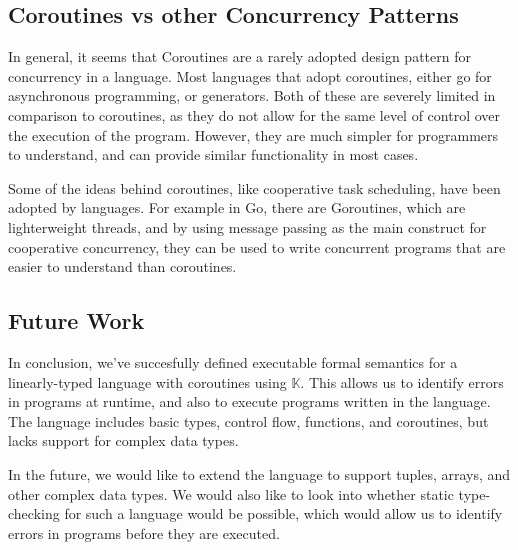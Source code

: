 \documentclass[review,twocolumn]{sigplanconf}
\begin{document}
\subsection*{Coroutines vs other Concurrency Patterns}

In general, it seems that Coroutines are a rarely adopted design pattern for concurrency in a language. Most languages that adopt coroutines, either go for asynchronous programming, or generators. Both of these are severely limited in comparison to coroutines, as they do not allow for the same level of control over the execution of the program. However, they are much simpler for programmers to understand, and can provide similar functionality in most cases.

Some of the ideas behind coroutines, like cooperative task scheduling, have been adopted by languages. For example in Go, there are Goroutines, which are lighterweight threads, and by using message passing as the main construct for cooperative concurrency, they can be used to write concurrent programs that are easier to understand than coroutines.

\subsection*{Future Work}

In conclusion, we've succesfully defined executable formal semantics for a linearly-typed language with coroutines using $\mathbb{K}$. This allows us to identify errors in programs at runtime, and also to execute programs written in the language. The language includes basic types, control flow, functions, and coroutines, but lacks support for complex data types.

In the future, we would like to extend the language to support tuples, arrays, and other complex data types. We would also like to look into whether static type-checking for such a language would be possible, which would allow us to identify errors in programs before they are executed.


\end{document}
